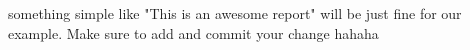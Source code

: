 something simple like "This is an awesome report" will be just fine for our example. Make sure to add and commit your change
hahaha

